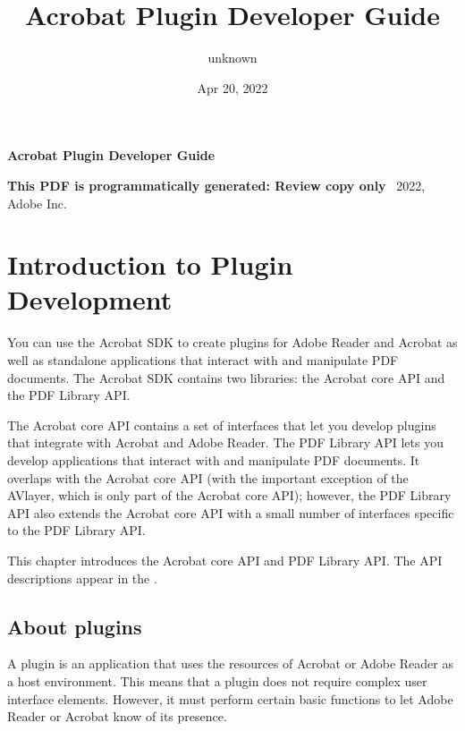 \documentclass[letterpaper,12pt,english,openany,oneside]{sphinxmanual}
\title{Acrobat Plugin Developer Guide}
\date{Apr 20, 2022}
\author{unknown}
\begin{document}
\pagestyle{empty}

    \begin{titlepage}
        \begin{figure}[h]
        \end{figure}
        \centering
        \vspace*{40mm}
        \textbf{\Huge Acrobat Plugin Developer Guide}

        \vspace{15mm}
        \Large \textbf{{This PDF is programmatically generated: Review copy only}}
        \vfill
        \small \textcopyright\ 2022, Adobe Inc.
    \end{titlepage}
    \clearpage
    \tableofcontents
    \clearpage
    
\pagestyle{plain}

\pagestyle{normal}
\label{\detokenize{toc::doc}}



\chapter{Introduction to Plugin Development}
\label{\detokenize{index:introduction-to-plugin-development}}\label{\detokenize{index::doc}}
You can use the Acrobat SDK to create plugins for Adobe Reader and Acrobat as well as stand\sphinxhyphen{}alone applications that interact with and manipulate PDF documents. The Acrobat SDK contains two libraries: the Acrobat core API and the PDF Library API.

The Acrobat core API contains a set of interfaces that let you develop plugins that integrate with Acrobat and Adobe Reader. The PDF Library API lets you develop applications that interact with and manipulate PDF documents. It overlaps with the Acrobat core API (with the important exception of the AV\sphinxhyphen{}layer, which is only part of the Acrobat core API); however, the PDF Library API also extends the Acrobat core API with a small number of interfaces specific to the PDF Library API.

This chapter introduces the Acrobat core API and PDF Library API. The API descriptions appear in the .


\section{About plugins}
\label{\detokenize{index:about-plugins}}
A plugin is an application that uses the resources of Acrobat or Adobe Reader as a host environment. This means that a plugin does not require complex user interface elements. However, it must perform certain basic functions to let Adobe Reader or Acrobat know of its presence.
\end{document}
